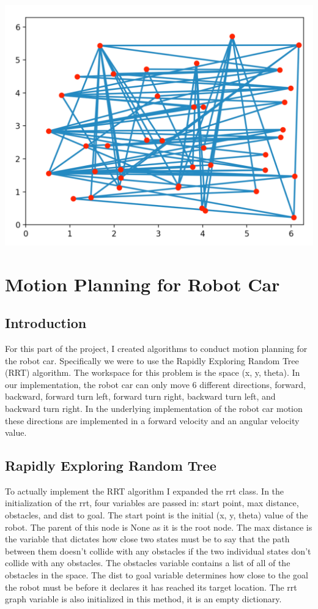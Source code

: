 \documentclass{article}
\begin{document}
\includegraphics[width=\textwidth]{prm_example.pdf}

\section{Motion Planning for Robot Car}
\subsection{Introduction}
For this part of the project, I created algorithms to conduct motion planning for the robot car. Specifically we were to use the Rapidly Exploring Random Tree (RRT) algorithm. The workspace for this problem is the space (x, y, theta). In our implementation, the robot car can only move 6 different directions, forward, backward, forward turn left, forward turn right, backward turn left, and backward turn right. In the underlying implementation of the robot car motion these directions are implemented in a forward velocity and an angular velocity value. 

\subsection{Rapidly Exploring Random Tree}
To actually implement the RRT algorithm I expanded the rrt class. In the initialization of the rrt, four variables are passed in: start point, max distance, obstacles, and dist to goal. The start point is the initial (x, y, theta) value of the robot. The parent of this node is None as it is the root node. The max distance is the variable that dictates how close two states must be to say that the path between them doesn't collide with any obstacles if the two individual states don't collide with any obstacles. The obstacles variable contains a list of all of the obstacles in the space. The dist to goal variable determines how close to the goal the robot must be before it declares it has reached its target location. The rrt graph variable is also initialized in this method, it is an empty dictionary. 
\end{document}
